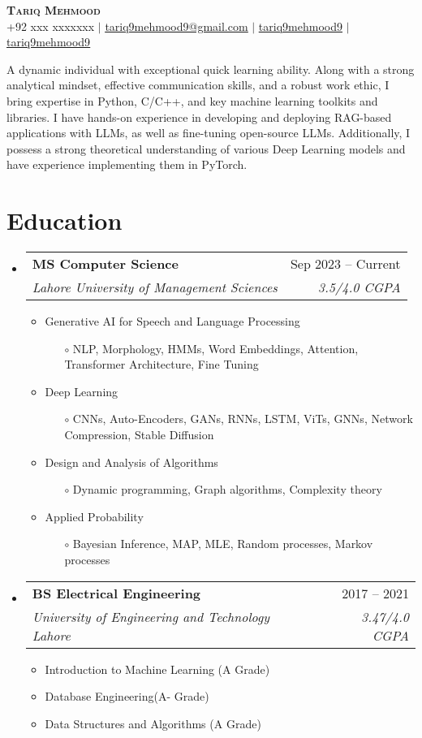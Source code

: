 \documentclass[letterpaper,11pt]{article}
\makeatletter
\newcommand{\resumeItem}[1]{
  \item\small{
    {#1 \vspace{-2pt}}
  }
}
\newcommand{\resumeSubItem}[1]{
  \begin{itemize}
    \item[$\circ$]\small{
      {#1 \vspace{-2pt}}
    }
  \end{itemize}
}
\newcommand{\resumeSubheading}[4]{
  \vspace{-2pt}\item
    \begin{tabular*}{0.97\textwidth}[t]{l@{\extracolsep{\fill}}r}
      \textbf{#1} & #2 \\
      \textit{\small#3} & \textit{\small #4} \\
    \end{tabular*}\vspace{-7pt}
}
\newcommand{\resumeSubHeadingListStart}{\begin{itemize}[leftmargin=0.15in, label={}]}
\newcommand{\resumeSubHeadingListEnd}{\end{itemize}}
\newcommand{\resumeItemListStart}{\begin{itemize}}
\newcommand{\resumeItemListEnd}{\end{itemize}\vspace{-5pt}}
\makeatother
\begin{document}
%
\begin{center}
  \textbf{\Huge \scshape Tariq Mehmood} \\ \vspace{1pt}
  \large{\faPhone\space}\small +92 xxx xxxxxxx $|$
  \large{\faEnvelope\space}\href{mailto:tariq9mehmood9@gmail.com}{\underline{tariq9mehmood9@gmail.com}} $|$ 
  \large{\faLinkedinSquare\space}\href{https://linkedin.com/in/tariq9mehmood9}{\underline{tariq9mehmood9}} $|$
  \large{\faGithub\space}\href{https://github.com/tariq9mehmood9}{\underline{tariq9mehmood9}}
\end{center}

%
\begin{flushleft}
A dynamic individual with exceptional quick learning ability. Along with a strong analytical mindset, effective communication skills, and a robust work ethic, I bring expertise in Python, C/C++, and key machine learning toolkits and libraries. I have hands-on experience in developing and deploying RAG-based applications with LLMs, as well as fine-tuning open-source LLMs. Additionally, I possess a strong theoretical understanding of various Deep Learning models and have experience implementing them in PyTorch.
\end{flushleft}

%
\section{Education}
  \resumeSubHeadingListStart
    \resumeSubheading
      {MS Computer Science}{Sep 2023 -- Current}
      {Lahore University of Management Sciences}{3.5/4.0 CGPA}
      \resumeItemListStart
        \resumeItem{Generative AI for Speech and Language Processing}
          \resumeSubItem{NLP, Morphology, HMMs, Word Embeddings, Attention, Transformer Architecture, Fine Tuning}
        \resumeItem{Deep Learning}
          \resumeSubItem{CNNs, Auto-Encoders, GANs, RNNs, LSTM, ViTs, GNNs, Network Compression, Stable Diffusion}
        \resumeItem{Design and Analysis of Algorithms}
          \resumeSubItem{Dynamic programming, Graph algorithms, Complexity theory}
        \resumeItem{Applied Probability}
          \resumeSubItem{Bayesian Inference, MAP, MLE, Random processes, Markov processes}
        \resumeItemListEnd
        
    \resumeSubheading
      {BS Electrical Engineering}{2017 -- 2021}
      {University of Engineering and Technology Lahore}{3.47/4.0 CGPA}
      \resumeItemListStart
        \resumeItem{Introduction to Machine Learning (A Grade)}
        \resumeItem{Database Engineering(A- Grade)}
        \resumeItem{Data Structures and Algorithms (A Grade)}
      \resumeItemListEnd
  \resumeSubHeadingListEnd
\end{document}
